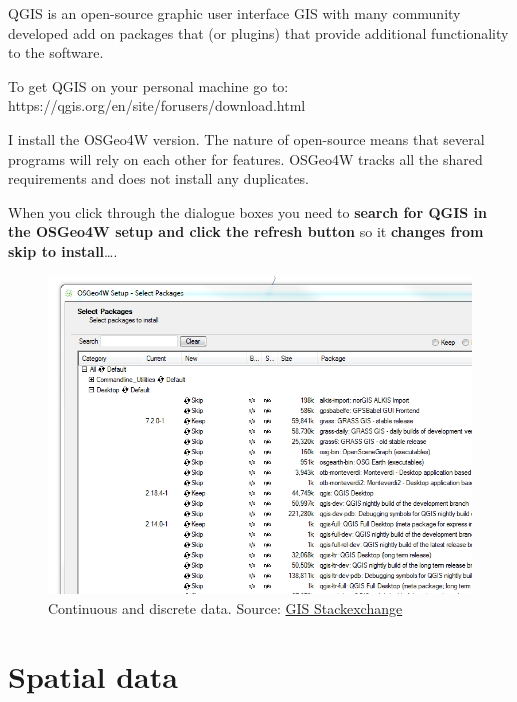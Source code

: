 \documentclass[
  letterpaper,
]{scrbook}
\begin{document}

QGIS is an open-source graphic user interface GIS with many community
developed add on packages that (or plugins) that provide additional
functionality to the software.

To get QGIS on your personal machine go to:
https://qgis.org/en/site/forusers/download.html

I install the OSGeo4W version. The nature of open-source means that
several programs will rely on each other for features. OSGeo4W tracks
all the shared requirements and does not install any duplicates.

When you click through the dialogue boxes you need to \textbf{search for
QGIS in the OSGeo4W setup and click the refresh button} so it
\textbf{changes from skip to install}\ldots.

\begin{figure}

{\centering \includegraphics[width=4.6875in,height=\textheight]{general_images/QGIS_install2.png}

}

\caption{Continuous and discrete data. Source:
\href{https://gis.stackexchange.com/questions/230672/how-to-install-osgeo4w-libraries-in-older-version-of-qgis-2-16}{GIS
Stackexchange}}

\end{figure}


\hypertarget{spatial-data}{%
\chapter{Spatial data}\label{spatial-data}}
\end{document}
